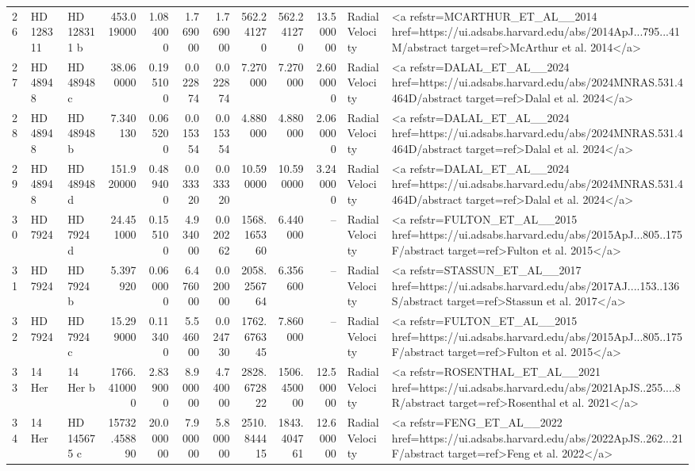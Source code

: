 \begin{tabular}{lllrrrrrrrll}
26 & HD 128311 & HD 128311 b & 453.019000 & 1.084000 & 1.769000 & 1.769000 & 562.241270 & 562.241270 & 13.500000 & Radial Velocity & <a refstr=MCARTHUR_ET_AL__2014 href=https://ui.adsabs.harvard.edu/abs/2014ApJ...795...41M/abstract target=ref>McArthur et al. 2014</a> \\
27 & HD 48948 & HD 48948 c & 38.060000 & 0.195100 & 0.022874 & 0.022874 & 7.270000 & 7.270000 & 2.600000 & Radial Velocity & <a refstr=DALAL_ET_AL__2024 href=https://ui.adsabs.harvard.edu/abs/2024MNRAS.531.4464D/abstract target=ref>Dalal et al. 2024</a> \\
28 & HD 48948 & HD 48948 b & 7.340130 & 0.065200 & 0.015354 & 0.015354 & 4.880000 & 4.880000 & 2.060000 & Radial Velocity & <a refstr=DALAL_ET_AL__2024 href=https://ui.adsabs.harvard.edu/abs/2024MNRAS.531.4464D/abstract target=ref>Dalal et al. 2024</a> \\
29 & HD 48948 & HD 48948 d & 151.920000 & 0.489400 & 0.033320 & 0.033320 & 10.590000 & 10.590000 & 3.240000 & Radial Velocity & <a refstr=DALAL_ET_AL__2024 href=https://ui.adsabs.harvard.edu/abs/2024MNRAS.531.4464D/abstract target=ref>Dalal et al. 2024</a> \\
30 & HD 7924 & HD 7924 d & 24.451000 & 0.155100 & 4.934000 & 0.020262 & 1568.165360 & 6.440000 & -- & Radial Velocity & <a refstr=FULTON_ET_AL__2015 href=https://ui.adsabs.harvard.edu/abs/2015ApJ...805..175F/abstract target=ref>Fulton et al. 2015</a> \\
31 & HD 7924 & HD 7924 b & 5.397920 & 0.060000 & 6.476000 & 0.020000 & 2058.256764 & 6.356600 & -- & Radial Velocity & <a refstr=STASSUN_ET_AL__2017 href=https://ui.adsabs.harvard.edu/abs/2017AJ....153..136S/abstract target=ref>Stassun et al. 2017</a> \\
32 & HD 7924 & HD 7924 c & 15.299000 & 0.113400 & 5.546000 & 0.024730 & 1762.676345 & 7.860000 & -- & Radial Velocity & <a refstr=FULTON_ET_AL__2015 href=https://ui.adsabs.harvard.edu/abs/2015ApJ...805..175F/abstract target=ref>Fulton et al. 2015</a> \\
33 & 14 Her & 14 Her b & 1766.410000 & 2.839000 & 8.900000 & 4.740000 & 2828.672822 & 1506.450000 & 12.500000 & Radial Velocity & <a refstr=ROSENTHAL_ET_AL__2021 href=https://ui.adsabs.harvard.edu/abs/2021ApJS..255....8R/abstract target=ref>Rosenthal et al. 2021</a> \\
34 & 14 Her & HD 145675 c & 15732.458890 & 20.000000 & 7.900000 & 5.800000 & 2510.844415 & 1843.404761 & 12.600000 & Radial Velocity & <a refstr=FENG_ET_AL__2022 href=https://ui.adsabs.harvard.edu/abs/2022ApJS..262...21F/abstract target=ref>Feng et al. 2022</a> \\

\end{tabular}
